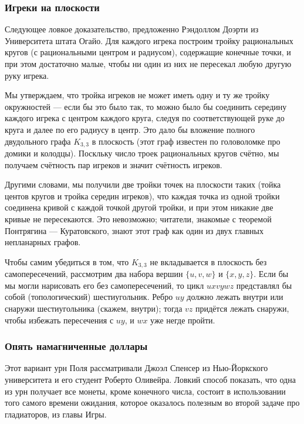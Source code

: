 \subsubsection*{Игреки на плоскости}

Следующее ловкое  доказательство, предложенно Рэндоллом Доэрти из Университета штата Огайо.
Для каждого игрека построим тройку рациональных кругов (с рациональными центром и радиусом), содержащие конечные точки, и при этом достаточно малые, чтобы ни один из них не пересекал любую другую руку игрека.

Мы утверждаем, что тройка игреков не может иметь одну и ту же тройку окружностей --- если бы это было так, то можно было бы соединить середину каждого игрека с центром каждого круга, следуя по соответствующей руке до круга и далее по его радиусу в центр.
Это дало бы вложение полного двудольного графа $K_{3,3}$ в плоскость (этот граф известен по головоломке про домики и колодцы).
Поскльку число троек рациональных кругов счётно, мы получаем счётность пар игреков и значит счётность игреков. %

Другими словами, мы получили две тройки точек на плоскости таких (тойка центов кругов и тройка середин игреков), что каждая точка из одной тройки соединена кривой с каждой точкой другой тройки, и при этом никакие две кривые не пересекаются.
Это невозможно; читатели, знакомые с теоремой Понтрягина --- Куратовского, знают этот граф как один из двух главных непланарных графов.

Чтобы самим убедиться в том, что $K_{3,3}$ не вкладывается в плоскость без самопересечений, рассмотрим два набора вершин $\{u, v, w\}$ и $\{x, y, z\}$.
Если бы мы могли нарисовать его без самопересечений, то цикл $uxvywz$ представлял бы  собой (топологический) шестиугольник.
Ребро $uy$ должно лежать внутри или снаружи шестиугольника (скажем, внутри);
тогда $vz$ придётся лежать снаружи, чтобы избежать пересечения с $uy$, и $wx$ уже негде пройти.
\heart

\subsubsection*{Опять намагниченные доллары}

Этот вариант урн Поля рассматривали Джоэл Спенсер из Нью-Йоркского университета и его студент Роберто Оливейра.
Ловкий способ показать, что одна из урн получает все монеты, кроме конечного числа, состоит в использовании того самого времени ожидания, которое оказалось полезным во второй задаче про гладиаторов, из главы Игры. %

